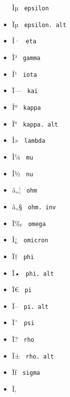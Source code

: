 \begin{itemize}
  \label{symbol-epsilon}{{ Îµ } \texttt{\ epsilon\ }}
\item
  \label{symbol-epsilon.alt}{{ Ïµ }
  \texttt{\ epsilon.\ alt\ }}
\item
  \label{symbol-eta}{{ Î· } \texttt{\ eta\ }}
\item
  \label{symbol-gamma}{{ Î³ } \texttt{\ gamma\ }}
\item
  \label{symbol-iota}{{ Î¹ } \texttt{\ iota\ }}
\item
  \label{symbol-kai}{{ Ï--- } \texttt{\ kai\ }}
\item
  \label{symbol-kappa}{{ Îº } \texttt{\ kappa\ }}
\item
  \label{symbol-kappa.alt}{{ Ï° }
  \texttt{\ kappa.\ alt\ }}
\item
  \label{symbol-lambda}{{ Î» } \texttt{\ lambda\ }}
\item
  \label{symbol-mu}{{ Î¼ } \texttt{\ mu\ }}
\item
  \label{symbol-nu}{{ Î½ } \texttt{\ nu\ }}
\item
  \label{symbol-ohm}{{ â„¦ } \texttt{\ ohm\ }}
\item
  \label{symbol-ohm.inv}{{ â„§ } \texttt{\ ohm.\ inv\ }}
\item
  \label{symbol-omega}{{ Ï‰ } \texttt{\ omega\ }}
\item
  \label{symbol-omicron}{{ Î¿ } \texttt{\ omicron\ }}
\item
  \label{symbol-phi}{{ Ï† } \texttt{\ phi\ }}
\item
  \label{symbol-phi.alt}{{ Ï• } \texttt{\ phi.\ alt\ }}
\item
  \label{symbol-pi}{{ Ï€ } \texttt{\ pi\ }}
\item
  \label{symbol-pi.alt}{{ Ï-- } \texttt{\ pi.\ alt\ }}
\item
  \label{symbol-psi}{{ Ïˆ } \texttt{\ psi\ }}
\item
  \label{symbol-rho}{{ Ï? } \texttt{\ rho\ }}
\item
  \label{symbol-rho.alt}{{ Ï± } \texttt{\ rho.\ alt\ }}
\item
  \label{symbol-sigma}{{ Ïƒ } \texttt{\ sigma\ }}
\item
  \label{symbol-sigma.alt}{{ Ï‚ }
}
\end{itemize}
